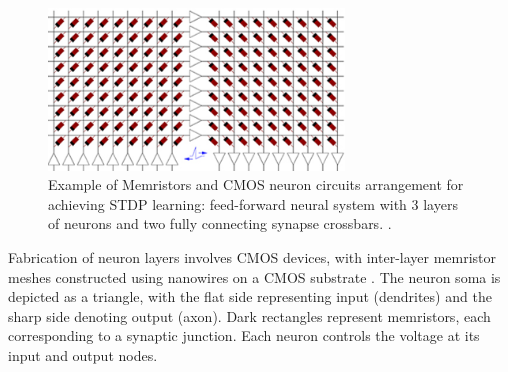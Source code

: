 \begin{figure}[htbp!] 
    \centering    
    \includegraphics[width=0.7\textwidth]{Chapter6/Figs/b.png}
    \caption[xample of Memristors and CMOS neuron circuits arrangement for achieving STDP learning.]{Example of Memristors and CMOS neuron circuits arrangement for achieving STDP learning: feed-forward neural system with 3 layers of neurons and two fully connecting synapse crossbars. \cite{saighi2015plasticity}.}
    \label{fig:6b}
\end{figure}



\noindent Fabrication of neuron layers involves CMOS devices, with inter-layer memristor meshes constructed using nanowires on a CMOS substrate \cite{saighi2015plasticity}. The neuron soma is depicted as a triangle, with the flat side representing input (dendrites) and the sharp side denoting output (axon). Dark rectangles represent memristors, each corresponding to a synaptic junction. Each neuron controls the voltage at its input and output nodes.\\

